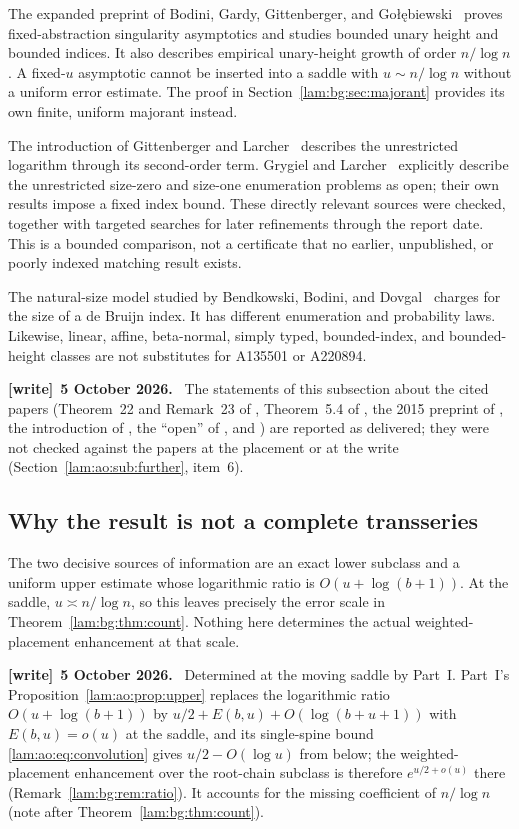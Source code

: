 \documentclass[11pt,a4paper]{article}
\numberwithin{equation}{section}
\theoremstyle{remark}
\newenvironment{writenote}[1][]{\par\smallskip\begingroup\small
 \noindent\textbf{[write]}\if\relax\detokenize{#1}\relax\else~\textbf{#1.}\fi\ }%
 {\par\endgroup\smallskip}
\begin{document}
The expanded preprint of Bodini, Gardy, Gittenberger, and Go\l\k{e}biewski~\cite{bggg2018} proves fixed-abstraction singularity asymptotics and studies bounded unary height and bounded indices. It also describes empirical unary-height growth of order $n/\log n$. A fixed-$u$ asymptotic cannot be inserted into a saddle with $u\sim n/\log n$ without a uniform error estimate. The proof in Section~\ref{lam:bg:sec:majorant} provides its own finite, uniform majorant instead.

The introduction of Gittenberger and Larcher~\cite{parameters} describes the unrestricted logarithm through its second-order term. Grygiel and Larcher~\cite{unaryprofile} explicitly describe the unrestricted size-zero and size-one enumeration problems as open; their own results impose a fixed index bound. These directly relevant sources were checked, together with targeted searches for later refinements through the report date. This is a bounded comparison, not a certificate that no earlier, unpublished, or poorly indexed matching result exists.

The natural-size model studied by Bendkowski, Bodini, and Dovgal~\cite{natural} charges for the size of a de Bruijn index. It has different enumeration and probability laws. Likewise, linear, affine, beta-normal, simply typed, bounded-index, and bounded-height classes are not substitutes for A135501 or A220894.
\begin{writenote}[5 October 2026]
The statements of this subsection about the cited papers (Theorem~22 and Remark~23 of \cite{bggj2013}, Theorem~5.4 of \cite{david2013}, the 2015 preprint of \cite{bggg2018}, the introduction of \cite{parameters}, the ``open'' of \cite{unaryprofile}, and \cite{natural}) are reported as delivered; they were not checked against the papers at the placement or at the write (Section~\ref{lam:ao:sub:further}, item~6).
\end{writenote}

\subsection{Why the result is not a complete transseries}
The two decisive sources of information are an exact lower subclass and a uniform upper estimate whose logarithmic ratio is $O(u+\log(b+1))$. At the saddle, $u\asymp n/\log n$, so this leaves precisely the error scale in Theorem~\ref{lam:bg:thm:count}. Nothing here determines the actual weighted-placement enhancement at that scale.
\begin{writenote}[5 October 2026]
Determined at the moving saddle by Part~I. Part~I's Proposition~\ref{lam:ao:prop:upper} replaces the logarithmic ratio $O(u+\log(b+1))$ by $u/2+E(b,u)+O(\log(b+u+1))$ with $E(b,u)=o(u)$ at the saddle, and its single-spine bound \eqref{lam:ao:eq:convolution} gives $u/2-O(\log u)$ from below; the weighted-placement enhancement over the root-chain subclass is therefore $e^{u/2+o(u)}$ there (Remark~\ref{lam:bg:rem:ratio}). It accounts for the missing coefficient of $n/\log n$ (note after Theorem~\ref{lam:bg:thm:count}).
\end{writenote}
\end{document}
